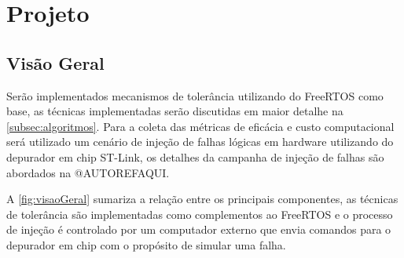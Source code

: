 

\chapter{Projeto}
\label{cap:proj}

\section{Visão Geral}

Serão implementados mecanismos de tolerância utilizando do FreeRTOS como base, as técnicas implementadas serão discutidas em maior detalhe na \autoref{subsec:algoritmos}. Para a coleta das métricas de eficácia e custo computacional será utilizado um cenário de injeção de falhas lógicas em hardware utilizando do depurador em chip ST-Link, os detalhes da campanha de injeção de falhas são abordados na @AUTOREFAQUI.

A \autoref{fig:visaoGeral} sumariza a relação entre os principais componentes, as técnicas de tolerância são implementadas como complementos ao FreeRTOS e o processo de injeção é controlado por um computador externo que envia comandos para o depurador em chip com o propósito de simular uma falha.

